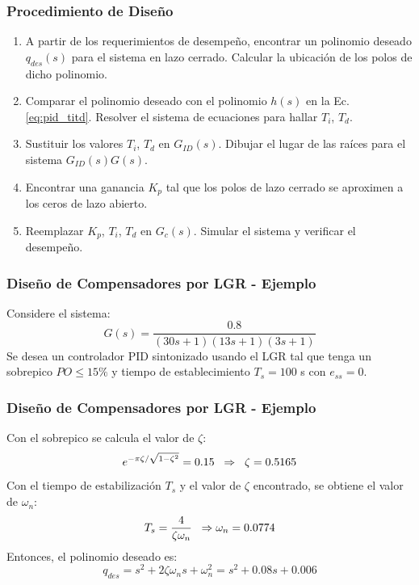 \documentclass[aspectratio=169,handout]{beamer}
\theoremstyle{definition}
\theoremstyle{plain}
\theoremstyle{remark}
\begin{document}
\begin{frame}[c]\frametitle{Procedimiento de Diseño}
	\begin{enumerate}
		\item A partir de los requerimientos de desempeño, encontrar un polinomio deseado $q_{des}(s)$ para el sistema en lazo cerrado. Calcular la ubicación de los polos de dicho polinomio.
		\item Comparar el polinomio deseado con el polinomio $h(s)$ en la Ec.\eqref{eq:pid_titd}. Resolver el sistema de ecuaciones para hallar $T_i$, $T_d$.
		\item Sustituir los valores $T_i$, $T_d$ en $G_{ID}(s)$. Dibujar el lugar de las raíces para el sistema $G_{ID}(s)G(s)$.
		\item Encontrar una ganancia $K_p$ tal que los polos de lazo cerrado se aproximen a los ceros de lazo abierto.
		\item Reemplazar $K_p$, $T_i$, $T_d$ en $G_c(s)$. Simular el sistema y verificar el desempeño.
	\end{enumerate}
\end{frame}

\begin{frame}[c]\frametitle{Diseño de Compensadores por LGR - Ejemplo}
	Considere el sistema:
	\begin{equation*}
		G(s) = \frac{0.8}{(30s+1)(13s+1)(3s+1)}
	\end{equation*}
	Se desea un controlador PID sintonizado usando el LGR tal que tenga un sobrepico $PO \leq 15\%$ y tiempo de establecimiento $T_s = 100$ s con $e_{ss} = 0$. 
\end{frame}

\begin{frame}[c]\frametitle{Diseño de Compensadores por LGR - Ejemplo}
	Con el sobrepico se calcula el valor de $\zeta$:
	\begin{equation*}
		e^{-\pi \zeta/\sqrt{1-\zeta^2}} = 0.15 \hspace*{2mm} \Rightarrow \hspace*{2mm} \zeta = 0.5165
	\end{equation*}
	Con el tiempo de estabilización $T_s$ y el valor de $\zeta$ encontrado, se obtiene el valor de $\omega_n$:
	\begin{align*}
		T_s = \frac{4}{\zeta \omega_n} \hspace*{2mm} \Rightarrow \vspace*{2mm} \omega_n = 0.0774
	\end{align*}
	Entonces, el polinomio deseado es:
	\begin{equation*}
		q_{des} = s^2 + 2\zeta\omega_n s + \omega_n^2 = s^2 + 0.08 s + 0.006
	\end{equation*}
\end{frame}
\end{document}
